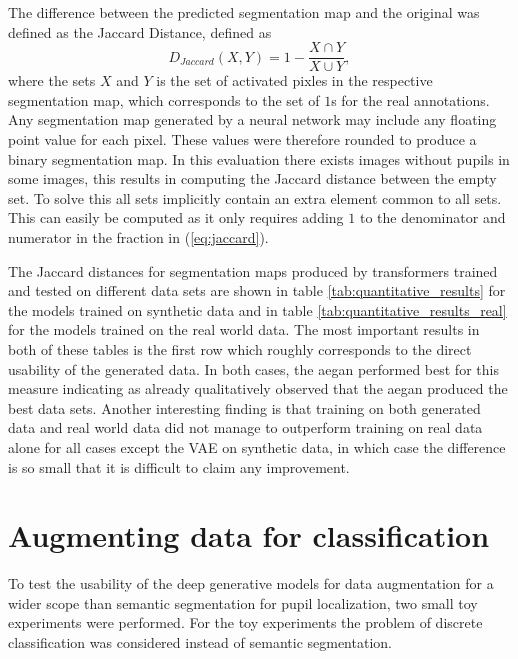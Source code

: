 The difference between the predicted segmentation map and the original was defined as the Jaccard Distance, defined as
\begin{equation}
    D_{Jaccard}(X, Y) = 1 - \frac{X \cap Y}{X \cup Y},
    \label{eq:jaccard}
\end{equation}
where the sets $X$ and $Y$ is the set of activated pixles in the respective segmentation map, which corresponds to the set of $1$s for the real annotations. Any segmentation map generated by a neural network may include any floating point value for each pixel. These values were therefore rounded to produce a binary segmentation map. In this evaluation there exists images without pupils in some images, this results in computing the Jaccard distance between the empty set. To solve this all sets implicitly contain an extra element common to all sets. This can easily be computed as it only requires adding $1$ to the denominator and numerator in the fraction in (\ref{eq:jaccard}).

The Jaccard distances for segmentation maps produced by transformers trained and tested on different data sets are shown in table \ref{tab:quantitative_results} for the models trained on synthetic data and in table \ref{tab:quantitative_results_real} for the models trained on the real world data. The most important results in both of these tables is the first row which roughly corresponds to the direct usability of the generated data. In both cases, the \acrshort{aegan} performed best for this measure indicating as already qualitatively observed that the \acrshort{aegan} produced the best data sets. Another interesting finding is that training on both generated data and real world data did not manage to outperform training on real data alone for all cases except the VAE on synthetic data, in which case the difference is so small that it is difficult to claim any improvement.


\section{Augmenting data for classification}
To test the usability of the deep generative models for data augmentation for a wider scope than semantic segmentation for pupil localization, two small toy experiments were performed. For the toy experiments the problem of discrete classification was considered instead of semantic segmentation.


